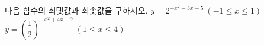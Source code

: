 다음 함수의 최댓값과 최솟값을 구하시오.
 $y=2^{-x^2-3x+5}\ (-1\le x\le 1)$
 $y=\left(\dfrac{1}{2}\right)^{-x^2+4x-7}\ (1\le x\le 4)$
